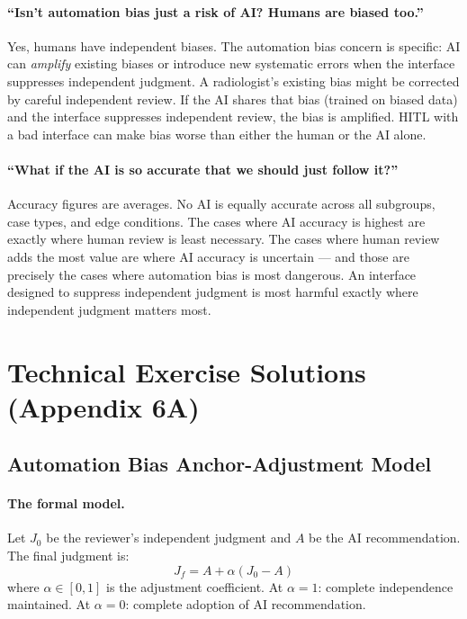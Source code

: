 \paragraph{``Isn't automation bias just a risk of AI? Humans are biased too.''}
Yes, humans have independent biases. The automation bias concern is specific: AI can \emph{amplify} existing biases or introduce new systematic errors when the interface suppresses independent judgment. A radiologist's existing bias might be corrected by careful independent review. If the AI shares that bias (trained on biased data) and the interface suppresses independent review, the bias is amplified. HITL with a bad interface can make bias worse than either the human or the AI alone.

\paragraph{``What if the AI is so accurate that we should just follow it?''}
Accuracy figures are averages. No AI is equally accurate across all subgroups, case types, and edge conditions. The cases where AI accuracy is highest are exactly where human review is least necessary. The cases where human review adds the most value are where AI accuracy is uncertain --- and those are precisely the cases where automation bias is most dangerous. An interface designed to suppress independent judgment is most harmful exactly where independent judgment matters most.

\section{Technical Exercise Solutions (Appendix 6A)}

\subsection{Automation Bias Anchor-Adjustment Model}

\paragraph{The formal model.}

Let $J_0$ be the reviewer's independent judgment and $A$ be the AI recommendation. The final judgment is:
\[
J_f = A + \alpha(J_0 - A)
\]
where $\alpha \in [0, 1]$ is the adjustment coefficient. At $\alpha = 1$: complete independence maintained. At $\alpha = 0$: complete adoption of AI recommendation.

